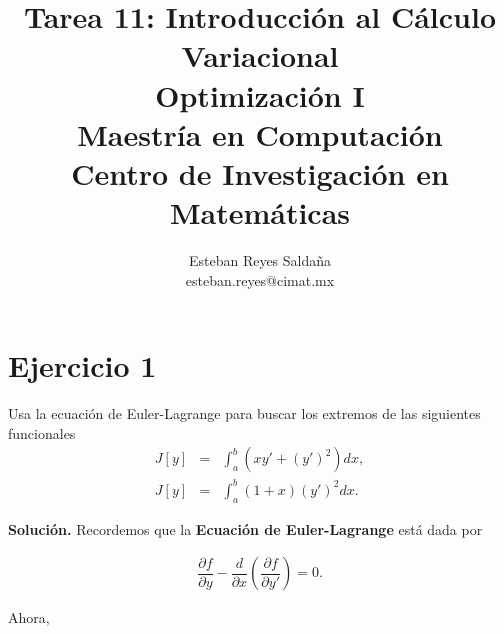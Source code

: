 \documentclass[11pt,letterpaper]{article}
\title{\textbf{Tarea 11: Introducción al Cálculo Variacional}\\ Optimización I \\ \Large {Maestría en Computación}\\ \Large {Centro de Investigación en Matemáticas}}
\author{Esteban Reyes Saldaña \\ esteban.reyes@cimat.mx}
\theoremstyle{definition}
\theoremstyle{definition}
\theoremstyle{definition}
\begin{document}
\twocolumn[
\begin{@twocolumnfalse}
	\maketitle
\end{@twocolumnfalse}]

\section*{Ejercicio 1}
\begin{shaded*}
	Usa la ecuación de Euler-Lagrange para buscar los extremos de las siguientes funcionales
	\begin{eqnarray}
		J\left[  y \right] & = & \int_{a}^{b} (xy' + (y')^2) dx, \\
		J\left[  y \right] & = & \int_{a}^{b} (1+x)(y')^2 dx.
	\end{eqnarray}
\end{shaded*}
\textbf{Solución.} Recordemos que la \textbf{Ecuación de Euler-Lagrange} está dada por
\begin{shaded*}
	\begin{eqnarray}
		\dfrac{\partial f}{\partial y} - \dfrac{d}{\partial x} \left( \dfrac{\partial f}{\partial y'} \right) = 0.
	\end{eqnarray}
\end{shaded*}
Ahora,
\end{document}
